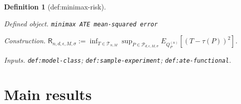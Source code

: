 \documentclass{article}
\newtheorem{definition}{Definition}
\begin{document}
\begin{definition}[def:minimax-risk]\label{def:minimax-risk}
\par\smallskip\noindent\emph{Defined object.} \texttt{minimax ATE mean-\allowbreak{}squared error}
\par\smallskip\noindent\emph{Construction.} \(\mathsf R_{n,d,\epsilon,M,\sigma}:=\inf_{T\in\mathcal T_{n,M}}\sup_{P\in\mathcal P_{d,\epsilon,M,\sigma}}E_{Q_P^{(n)}}[(T-\tau(P))^2]\).
\par\smallskip\noindent\emph{Inputs.} \texttt{def:\allowbreak{}model-\allowbreak{}class}; \texttt{def:\allowbreak{}sample-\allowbreak{}experiment}; \texttt{def:\allowbreak{}ate-\allowbreak{}functional}.
\end{definition}

\section{Main results}
\end{document}
